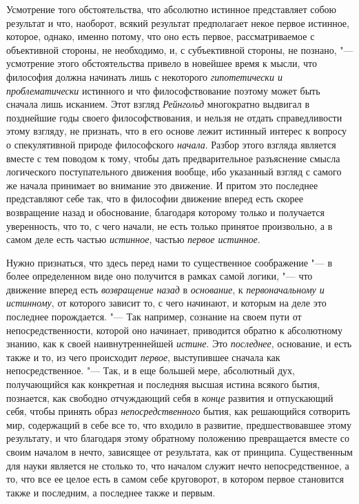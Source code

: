 Усмотрение того обстоятельства, что абсолютно истинное представляет собою
результат и что, наоборот, всякий результат предполагает некое первое
истинное, которое, однако, именно потому, что оно есть первое,
рассматриваемое с объективной стороны, не необходимо, и, с субъективной
стороны, не познано, "--- усмотрение этого обстоятельства привело в новейшее
время к мысли, что философия должна начинать лишь с некоторого
{\em гипотетически и проблематически} истинного и что
философствование поэтому может быть сначала лишь исканием. Этот взгляд
{\em Рейнгольд} многократно выдвигал в позднейшие годы
своего философствования, и нельзя не отдать справедливости этому взгляду,
не признать, что в его основе лежит истинный интерес к вопросу о
спекулятивной природе философского {\em начала}. Разбор
этого взгляда является вместе с тем поводом к тому, чтобы дать
предварительное разъяснение смысла логического поступательного движения
вообще, ибо указанный взгляд с самого же начала принимает во внимание это
движение. И притом это последнее представляют себе так, что в философии
движение вперед есть скорее возвращение назад и обоснование, благодаря
которому только и получается уверенность, что то, с чего начали, не есть
только принятое произвольно, а в самом деле есть частью
{\em истинное}, частью {\em первое истинное}.

Нужно признаться, что здесь перед нами то существенное соображение "--- в более
определенном виде оно получится в рамках самой логики, "--- что движение
вперед есть {\em возвращение назад} в {\em основание}, к
{\em первоначальному и истинному}, от которого зависит
то, с чего начинают, и которым на деле это последнее порождается. "--- Так
например, сознание на своем пути от непосредственности, которой оно
начинает, приводится обратно к абсолютному знанию, как к своей
наивнутреннейшей {\em истине}. Это
{\em последнее}, основание, и есть также и то, из чего
происходит {\em первое}, выступившее сначала как
непосредственное. "--- Так, и в еще большей мере, абсолютный дух, получающийся
как конкретная и последняя высшая истина всякого бытия, познается, как
свободно отчуждающий себя в {\em конце} развития и
отпускающий себя, чтобы принять образ
{\em непосредственного} бытия, как решающийся сотворить
мир, содержащий в себе все то, что входило в развитие, предшествовавшее
этому результату, и что благодаря этому обратному положению превращается
вместе со своим началом в нечто, зависящее от результата, как от принципа.
Существенным для науки является не столько то, что началом служит нечто
непосредственное, а то, что все ее целое есть в самом себе круговорот, в
котором первое становится также и последним, а последнее также и первым.

